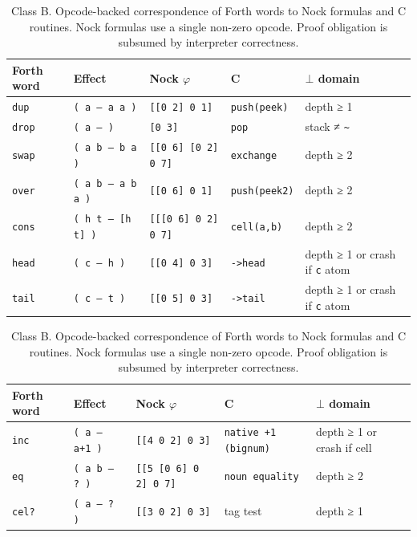 \documentclass[twoside]{article}
\begin{document}
\begin{table}
\centering
\caption{Class A.  Structural correspondence of Forth words to Nock formulas and C routines.  Nock formulas use only opcode \texttt{0} and autocons.  Correctness follows from tree arithmetic.}
\label{tbl:forth-a}
\begin{tabular}{lllll}
\toprule
Forth word & Effect & Nock $\varphi$ & C & $\bot$ domain \\ \midrule
\texttt{dup} & \texttt{( a — a a )} & \texttt{[[0 2] 0 1]} & \texttt{push(peek)} & depth ≥ 1 \\
\texttt{drop} & \texttt{( a — )} & \texttt{[0 3]} & \texttt{pop} & stack ≠ \texttt{\textasciitilde} \\
\texttt{swap} & \texttt{( a b — b a )} & \texttt{[[0 6] [0 2] 0 7]} & \texttt{exchange} & depth ≥ 2 \\
\texttt{over} & \texttt{( a b — a b a )} & \texttt{[[0 6] 0 1]} & \texttt{push(peek2)} & depth ≥ 2 \\
\texttt{cons} & \texttt{( h t — [h t] )} & \texttt{[[[0 6] 0 2] 0 7]} & \texttt{cell(a,b)} & depth ≥ 2 \\
\texttt{head} & \texttt{( c — h )} & \texttt{[[0 4] 0 3]} & \texttt{->head} & depth ≥ 1 or crash if \texttt{c} atom \\
\texttt{tail} & \texttt{( c — t )} & \texttt{[[0 5] 0 3]} & \texttt{->tail} & depth ≥ 1 or crash if \texttt{c} atom \\
\bottomrule
\end{tabular}

\vspace{1.5em}  %

\centering
\caption{Class B.  Opcode-backed correspondence of Forth words to Nock formulas and C routines.  Nock formulas use a single non-zero opcode.  Proof obligation is subsumed by interpreter correctness.}
\label{tbl:forth-b}
\begin{tabular}{lllll}
\toprule
Forth word & Effect & Nock $\varphi$ & C & $\bot$ domain \\ \midrule
\texttt{inc} & \texttt{( a — a+1 )} & \texttt{[[4 0 2] 0 3]} & \texttt{native +1 (bignum)} & depth ≥ 1 or crash if cell \\
\texttt{eq} & \texttt{( a b — ? )} & \texttt{[[5 [0 6] 0 2] 0 7]} & \texttt{noun equality} & depth ≥ 2 \\
\texttt{cel?} & \texttt{( a — ? )} & \texttt{[[3 0 2] 0 3]} & tag test & depth ≥ 1 \\
\bottomrule
\end{tabular}
\end{table}
\end{document}
